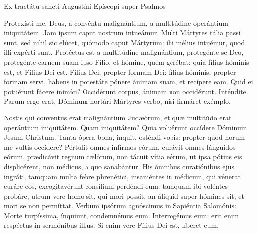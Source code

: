 





\lesson

Ex tractátu sancti Augustíni Epíscopi super Psalmos


Protexísti me, Deus, a convéntu malignántium, a multitúdine operántium
iniquitátem. Jam ipsum caput nostrum intueámur. Multi Mártyres tália passi
sunt, sed nihil sic elúcet, quómodo caput Mártyrum: ibi mélius intuémur, quod
illi expérti sunt. Protéctus est a multitúdine malignántium, protegénte se Deo,
protegénte carnem suam ipso Fílio, et hómine, quem gerébat: quia fílius hóminis
est, et Fílius Dei est. Fílius Dei, propter formam Dei: fílius hóminis, propter
formam servi, habens in potestáte pónere ánimam suam, et recípere eam. Quid ei
potuérunt fácere inimíci? Occidérunt corpus, ánimam non occidérunt. Inténdite.
Parum ergo erat, Dóminum hortári Mártyres verbo, nisi firmáret exémplo.


\lesson


Nostis qui convéntus erat malignántium Judæórum, et quæ multitúdo erat
operántium iniquitátem. Quam iniquitátem? Quia voluérunt occídere Dóminum
Jesum Christum. Tanta ópera bona, inquit, osténdi vobis: propter quod horum
me vultis occídere? Pértulit omnes infírmos eórum, curávit omnes lánguidos
eórum, prædicávit regnum cælórum, non tácuit vítia eórum, ut ipsa pótius
eis displicérent, non médicus, a quo sanabántur. His ómnibus curatiónibus
ejus ingráti, tamquam multa febre phrenétici, insaniéntes in médicum, qui
vénerat curáre eos, excogitavérunt consílium perdéndi eum: tamquam ibi
voléntes probáre, utrum vere homo sit, qui mori possit, an áliquid super
hómines sit, et mori se non permíttat. Verbum ipsórum agnóscimus in
Sapiéntia Salomónis: Morte turpíssima, ínquiunt, condemnémus eum.
Interrogémus eum: erit enim respéctus in sermónibus illíus. Si enim vere
Fílius Dei est, líberet eum.

